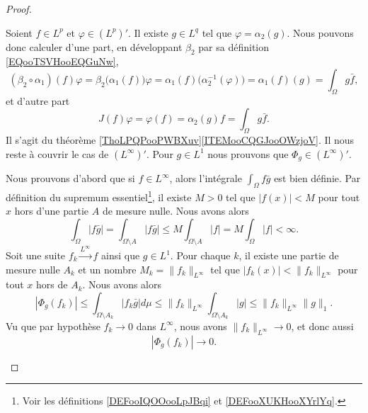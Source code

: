 \begin{proof}
\begin{subproof}
		Soient \( f\in L^p\) et \( \varphi\in (L^p)'\). Il existe \( g\in L^q\) tel que \( \varphi=\alpha_2(g)\). Nous pouvons donc calculer d'une part, en développant \( \beta_2\) par sa définition \eqref{EQooTSVHooEQGuNw},
		\begin{equation}
			(\beta_2\circ \alpha_1)(f)\varphi=\beta_2\big( \alpha_1(f) \big)\varphi
			=\alpha_1(f)\big( \alpha_2^{-1}(\varphi) \big)
			=\alpha_1(f)(g)
			=\int_{\Omega}g\bar f,
		\end{equation}
		et d'autre part
		\begin{equation}
			J(f)\varphi=\varphi(f)
			=\alpha_2(g)f
			=\int_{\Omega}g\bar f.
		\end{equation}
		Il s'agit du théorème \ref{ThoLPQPooPWBXuv}\ref{ITEMooCQGJooOWzjoV}.
		Il nous reste à couvrir le cas de \( (L^{\infty})'\). Pour \( g\in L^1\) nous prouvons que \( \Phi_g\in (L^{\infty})'\).

		\begin{subproof}
			Nous prouvons d'abord que si \( f\in L^{\infty}\), alors l'intégrale \( \int_{\Omega}f\bar g\) est bien définie. Par définition du supremum essentiel\footnote{Voir les définitions \ref{DEFooIQOOooLpJBqi} et \ref{DEFooXUKHooXYrlYq}.}, il existe \( M>0\) tel que \( | f(x) |<M\) pour tout \( x\) hors d'une partie \( A\) de mesure nulle. Nous avons alors
			\begin{equation}
				\int_{\Omega}|f\bar g|=\int_{\Omega\setminus A}| f\bar g |\leq M\int_{\Omega\setminus A}| f |= M\int_{\Omega}| f |<\infty.
			\end{equation}
			Soit une suite \( f_k\stackrel{L^{\infty}}{\longrightarrow}f\) ainsi que \( g\in L^1\). Pour chaque \( k\), il existe une partie de mesure nulle \( A_k\) et un nombre \( M_k=\| f_k \|_{L^{\infty}}\) tel que \( | f_k(x) |<\| f_k \|_{L^{\infty}}\) pour tout \( x\) hors de \( A_k\). Nous avons alors
			\begin{equation}
				| \Phi_g(f_k) |\leq \int_{\Omega\setminus A_k}| f_k\bar g |d\mu\leq \| f_k \|_{L^{\infty}}\int_{\Omega\setminus A_k}| g |\leq \| f_k \|_{L^{\infty}}\| g \|_1.
			\end{equation}
			Vu que par hypothèse \( f_k\to 0\) dans \( L^{\infty}\), nous avons \( \| f_k \|_{L^{\infty}}\to 0\), et donc aussi
			\begin{equation}
				|\Phi_g(f_k)|\to 0.
			\end{equation}
		\end{subproof}
	\end{subproof}
\end{proof}

